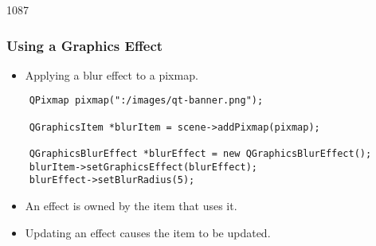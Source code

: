 \begin{slide}[fragile]{1087}\frametitle{Using a Graphics Effect}

\begin{itemize}
\item Applying a blur effect to a pixmap.
\end{itemize}

\begin{lstlisting}
    QPixmap pixmap(":/images/qt-banner.png");

    QGraphicsItem *blurItem = scene->addPixmap(pixmap);

    QGraphicsBlurEffect *blurEffect = new QGraphicsBlurEffect();
    blurItem->setGraphicsEffect(blurEffect);
    blurEffect->setBlurRadius(5);
\end{lstlisting}

\begin{itemize}
\item An effect is owned by the item that uses it.
\item Updating an effect causes the item to be updated.
\end{itemize}
 \\

\end{slide}

